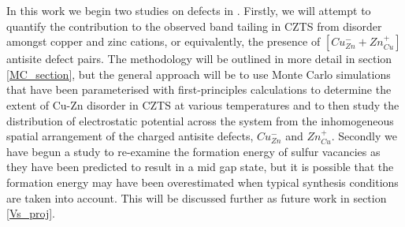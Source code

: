 In this work we begin two studies on defects in {\CZTS}. Firstly, we will attempt to quantify the contribution to the observed band tailing in CZTS from disorder amongst copper and zinc cations, or equivalently, the presence of $[Cu_{Zn}^{-} + Zn_{Cu}^{+}]$ antisite defect pairs. The methodology will be outlined in more detail in section \ref{MC_section}, but the general approach will be to use Monte Carlo simulations that have been parameterised with first-principles calculations to determine the extent of Cu-Zn disorder in CZTS at various temperatures and to then study the distribution of electrostatic potential across the system from the inhomogeneous spatial arrangement of the charged antisite defects,  $Cu_{Zn}^-$ and $Zn_{Cu}^+$.
Secondly we have begun a study to re-examine the formation energy of sulfur vacancies as they have been predicted \cite{defect1} to result in a mid gap state, but it is possible that the formation energy may have been overestimated when typical synthesis conditions are taken into account. This will be discussed further as future work in section \ref{Vs_proj}.















